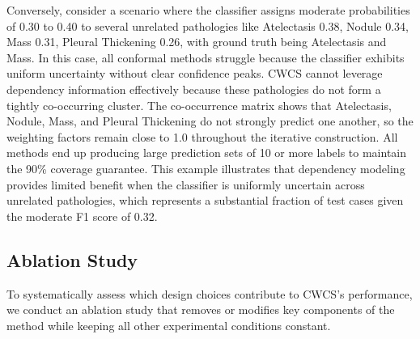 Conversely, consider a scenario where the classifier assigns moderate probabilities of 0.30 to 0.40 to several unrelated pathologies like Atelectasis 0.38, Nodule 0.34, Mass 0.31, Pleural Thickening 0.26, with ground truth being Atelectasis and Mass.
In this case, all conformal methods struggle because the classifier exhibits uniform uncertainty without clear confidence peaks.
CWCS cannot leverage dependency information effectively because these pathologies do not form a tightly co-occurring cluster.
The co-occurrence matrix shows that Atelectasis, Nodule, Mass, and Pleural Thickening do not strongly predict one another, so the weighting factors remain close to 1.0 throughout the iterative construction.
All methods end up producing large prediction sets of 10 or more labels to maintain the 90\% coverage guarantee.
This example illustrates that dependency modeling provides limited benefit when the classifier is uniformly uncertain across unrelated pathologies, which represents a substantial fraction of test cases given the moderate F1 score of 0.32.

\subsection{Ablation Study}
\label{subsec:ablation-study}

To systematically assess which design choices contribute to CWCS's performance, we conduct an ablation study that removes or modifies key components of the method while keeping all other experimental conditions constant.

\begin{table}[H]
\centering
\caption{Ablation study examining the impact of different CWCS design choices. The full CWCS configuration uses asymmetric co-occurrence weighting with strength $\lambda=1.0$ and filters weak edges below threshold 0.10. Removing filtering increases set size by 3.3\% due to noise from spurious correlations for rare pairs. Reducing weighting strength to $\lambda=0.5$ yields performance between CWCS and Standard CP. Using symmetric co-occurrence produces results nearly identical to Tree-based CQioC at 9.91 labels, confirming both methods essentially model symmetric pairwise dependencies. The full range spans only 5\% from 9.82 to 10.31 labels, indicating modest impact of dependency modeling under extreme imbalance with weak classifiers.}
\label{tab:ablation}
\end{table}

